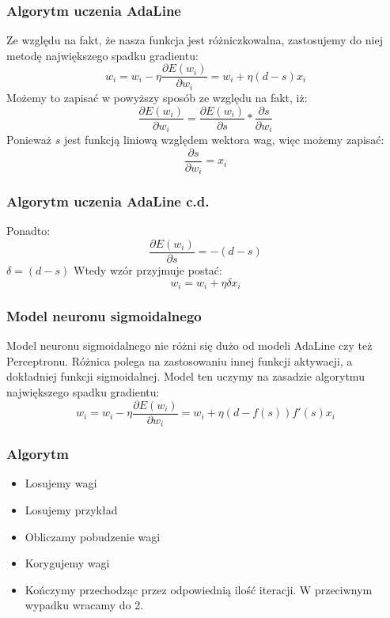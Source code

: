 \documentclass[16pt]{beamer}
\begin{document}
\begin{frame}
\frametitle{Algorytm uczenia AdaLine}
Ze względu na fakt, że nasza funkcja jest różniczkowalna, zastosujemy do niej metodę największego spadku gradientu:
\[
	w_i = w_i - \eta \frac{\partial E(w_i)}{\partial w_i} = w_i + \eta(d-s)x_i
\]
Możemy to zapisać w powyższy sposób ze względu na fakt, iż:
\[
	\frac{\partial E(w_i)}{\partial w_i} = \frac{\partial E(w_i)}{\partial s} * \frac{\partial s}{\partial w_i}
\]
Ponieważ $s$ jest funkcją liniową względem wektora wag, więc możemy zapisać:
\[
	\frac{\partial s}{\partial w_i} = x_i
\]
\end{frame}

\begin{frame}
\frametitle{Algorytm uczenia AdaLine c.d.}
Ponadto:
\[
	\frac{\partial E(w_i)}{\partial s} = -(d-s)
\]
$\delta = (d-s)$
Wtedy wzór przyjmuje postać:
\[
w_i = w_i + \eta \delta x_i
\]
\end{frame}

\begin{frame}
\frametitle{Model neuronu sigmoidalnego}
Model neuronu sigmoidalnego nie różni się dużo od modeli AdaLine czy też Perceptronu. Różnica polega na zastosowaniu innej funkcji aktywacji, a dokładniej funkcji sigmoidalnej. Model ten uczymy na zasadzie algorytmu największego spadku gradientu:
\[
	w_i = w_i - \eta \frac{\partial E(w_i)}{\partial w_i} = w_i + \eta(d-f(s))f'(s)x_i
\]
\end{frame}

\begin{frame}
\frametitle{Algorytm}
\begin{itemize}
	\item Losujemy wagi
	\item Losujemy przykład
	\item Obliczamy pobudzenie wagi
	\item Korygujemy wagi
	\item Kończymy przechodząc przez odpowiednią ilość iteracji. W przeciwnym wypadku wracamy do 2.
\end{itemize}
\end{frame}
\end{document}
